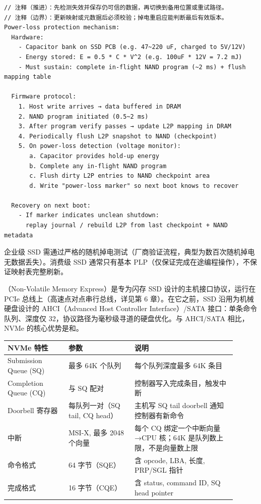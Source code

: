\begin{lstlisting}
// 注释（推进）：先检测失效并保存仍可信的数据，再切换到备用位置或重试路径。
// 注释（边界）：更新映射或元数据后必须校验；掉电重启应能判断最后有效版本。
Power-loss protection mechanism:
  Hardware:
    - Capacitor bank on SSD PCB (e.g. 47~220 uF, charged to 5V/12V)
    - Energy stored: E = 0.5 * C * V^2 (e.g. 100uF * 12V = 7.2 mJ)
    - Must sustain: complete in-flight NAND program (~2 ms) + flush mapping table

  Firmware protocol:
    1. Host write arrives → data buffered in DRAM
    2. NAND program initiated (0.5~2 ms)
    3. After program verify passes → update L2P mapping in DRAM
    4. Periodically flush L2P snapshot to NAND (checkpoint)
    5. On power-loss detection (voltage monitor):
       a. Capacitor provides hold-up energy
       b. Complete any in-flight NAND program
       c. Flush dirty L2P entries to NAND checkpoint area
       d. Write "power-loss marker" so next boot knows to recover

  Recovery on next boot:
    - If marker indicates unclean shutdown:
      replay journal / rebuild L2P from last checkpoint + NAND metadata
\end{lstlisting}

企业级 SSD 需通过严格的随机掉电测试（厂商验证流程，典型为数百次随机掉电无数据丢失）。消费级 SSD 通常只有基本 PLP（仅保证完成在途编程操作），不保证映射表完整刷新。


（Non-Volatile Memory Express）是专为闪存 SSD 设计的主机接口协议，运行在 PCIe 总线上（高速点对点串行总线，详见第 6 章）。在它之前，SSD 沿用为机械硬盘设计的 AHCI（Advanced Host Controller Interface）/SATA 接口：单条命令队列、深度仅 32，协议路径为毫秒级寻道的硬盘优化。与 AHCI/SATA 相比，NVMe 的核心优势是和。

\begin{longtable}{L{0.24\linewidth}L{0.26\linewidth}L{0.4\linewidth}}
\toprule
NVMe 特性 & 参数 & 说明 \\
\midrule
Submission Queue (SQ) & 最多 64K 个队列 & 每个队列深度最多 64K 条目 \\\tablerowrule
Completion Queue (CQ) & 与 SQ 配对 & 控制器写入完成条目，触发中断 \\\tablerowrule
Doorbell 寄存器 & 每队列一对（SQ tail, CQ head） & 主机写 SQ tail doorbell 通知控制器有新命令 \\\tablerowrule
中断 & MSI-X, 最多 2048 个向量 & 每个 CQ 绑定一个中断向量→CPU 核；64K 是队列数上限，不是向量数上限 \\\tablerowrule
命令格式 & 64 字节（SQE） & 含 opcode, LBA, 长度, PRP/SGL 指针 \\\tablerowrule
完成格式 & 16 字节（CQE） & 含 status, command ID, SQ head pointer \\
\bottomrule
\end{longtable}

